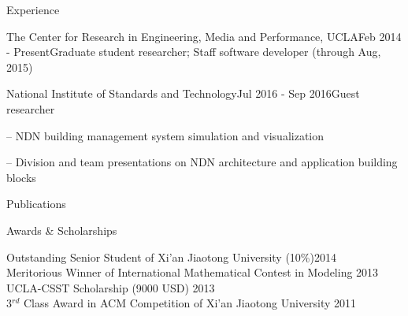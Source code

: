 \documentclass{resume} %
\begin{document}
\begin{rSection}{Experience}
\begin{rSubsection}{The Center for Research in Engineering, Media and Performance, UCLA}{Feb 2014 - Present}{Graduate student researcher; Staff software developer (through Aug, 2015)}{}
\end{rSubsection}

\begin{rSubsection}{National Institute of Standards and Technology}{Jul 2016 - Sep 2016}{Guest researcher}{}
\item[--] NDN building management system simulation and visualization
\item[--] Division and team presentations on NDN architecture and application building blocks
\end{rSubsection}

\end{rSection}


\begin{rSection}{Publications}

\nocite{*}




\end{rSection}


\begin{rSection}{Awards \& Scholarships}

Outstanding Senior Student of Xi'an Jiaotong University (10\%)\hfill 2014 \\
Meritorious Winner of International Mathematical Contest in Modeling \hfill 2013 \\
UCLA-CSST Scholarship (9000 USD) \hfill 2013 \\
3$^{rd}$ Class Award in ACM Competition of Xi'an Jiaotong University \hfill 2011 \\

\end{rSection}
\end{document}
